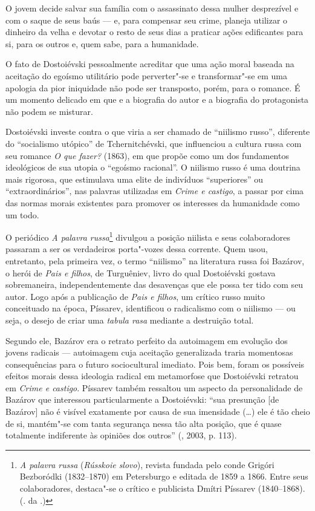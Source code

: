 O jovem decide salvar sua família com o assassinato dessa mulher
desprezível e com o saque de seus baús --- e, para compensar seu crime,
planeja utilizar o dinheiro da velha e devotar o resto de seus dias a
praticar ações edificantes para si, para os outros e, quem sabe, para a
humanidade.

O fato de Dostoiévski pessoalmente acreditar que uma ação moral baseada
na aceitação do egoísmo utilitário pode perverter"-se e transformar"-se em
uma apologia da pior iniquidade não pode ser transposto, porém, para o
romance. É um momento delicado em que e a biografia do autor e a
biografia do protagonista não podem se misturar.

Dostoiévski investe contra o que viria a ser chamado de ``niilismo
russo'', diferente do ``socialismo utópico'' de Tchernitchévski, que
influenciou a cultura russa com seu romance \emph{O que fazer?} (1863),
em que propõe como um dos fundamentos ideológicos de sua utopia o
``egoísmo racional''. O niilismo russo é uma doutrina mais rigorosa, que
estimulava uma elite de indivíduos ``superiores'' ou
``extraordinários'', nas palavras utilizadas em \emph{Crime e castigo},
a passar por cima das normas morais existentes para promover os
interesses da humanidade como um todo.

O periódico \emph{A palavra russa}\footnote{\emph{A palavra russa}
  (\emph{Rússkoie slovo}), revista fundada pelo conde Grigóri Bezboródki
  (1832--1870) em Petersburgo e editada de 1859 a 1866. Entre seus
  colaboradores, destaca"-se o crítico e publicista Dmítri Píssarev
  (1840--1868). (. da .)} divulgou a posição niilista e seus
colaboradores passaram a ser os verdadeiros porta"-vozes dessa corrente.
Quem usou, entretanto, pela primeira vez, o termo ``niilismo'' na
literatura russa foi Bazárov, o herói de \emph{Pais e filhos}, de
Turguêniev, livro do qual Dostoiévski gostava sobremaneira,
independentemente das desavenças que ele possa ter tido com seu autor.
Logo após a publicação de \emph{Pais e filhos}, um crítico russo muito
conceituado na época, Píssarev, identificou o radicalismo com o niilismo
--- ou seja, o desejo de criar uma \emph{tabula rasa} mediante a
destruição total.

Segundo ele, Bazárov era o retrato perfeito da autoimagem em evolução
dos jovens radicais --- autoimagem cuja aceitação generalizada traria
momentosas consequências para o futuro sociocultural imediato. Pois bem,
foram os possíveis efeitos morais dessa ideologia radical em metamorfose
que Dostoiévski retratou em \emph{Crime e castigo}. Píssarev também
ressaltou um aspecto da personalidade de Bazárov que interessou
particularmente a Dostoiévski: ``sua presunção [de Bazárov] não é
visível exatamente por causa de sua imensidade (\ldots{}) ele é tão cheio de
si, mantém"-se com tanta segurança nessa tão alta posição, que é quase
totalmente indiferente às opiniões dos outros'' (, 2003, p. 113).

